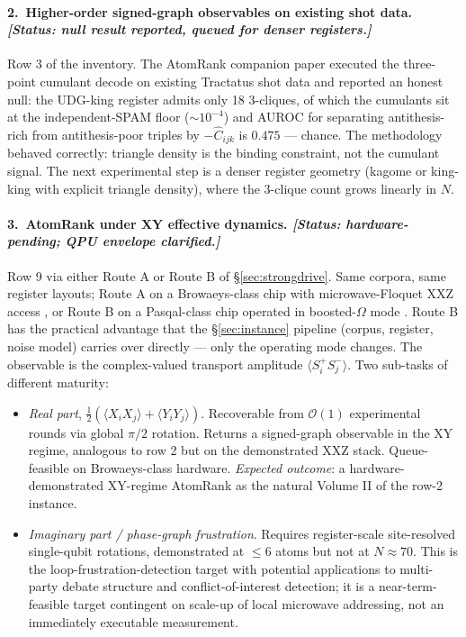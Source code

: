 \documentclass[10pt]{article}
\begin{document}
\paragraph{2.\ Higher-order signed-graph observables on existing shot data. \emph{[Status: null result reported, queued for denser registers.]}}
Row 3 of the inventory. The AtomRank companion paper \cite{jurczak2026atomrank} executed the three-point cumulant decode on existing Tractatus shot data and reported an honest null: the UDG-king register admits only 18 3-cliques, of which the cumulants sit at the independent-SPAM floor ($\sim 10^{-4}$) and AUROC for separating antithesis-rich from antithesis-poor triples by $-\hat C_{ijk}$ is $0.475$ --- chance. The methodology behaved correctly: triangle density is the binding constraint, not the cumulant signal. The next experimental step is a denser register geometry (kagome or king-king with explicit triangle density), where the 3-clique count grows linearly in $N$.

\paragraph{3.\ AtomRank under XY effective dynamics. \emph{[Status: hardware-pending; QPU envelope clarified.]}}
Row 9 via either Route A or Route B of \S\ref{sec:strongdrive}. Same corpora, same register layouts; Route A on a Browaeys-class chip with microwave-Floquet XXZ access \cite{scholl2022microwave,chen2024spectroscopy}, or Route B on a Pasqal-class chip operated in boosted-$\Omega$ mode \cite{ciavarella2022heisenberg}. Route B has the practical advantage that the \S\ref{sec:instance} pipeline (corpus, register, noise model) carries over directly --- only the operating mode changes. The observable is the complex-valued transport amplitude $\langle S^+_i S^-_j\rangle$. Two sub-tasks of different maturity:
\begin{itemize}[leftmargin=2em, itemsep=0.2em, topsep=0.3em]
\item[\textit{3a.}] \emph{Real part}, $\tfrac{1}{2}(\langle X_iX_j\rangle + \langle Y_iY_j\rangle)$. Recoverable from $\mathcal{O}(1)$ experimental rounds via global $\pi/2$ rotation. Returns a signed-graph observable in the XY regime, analogous to row 2 but on the demonstrated XXZ stack. Queue-feasible on Browaeys-class hardware. \emph{Expected outcome}: a hardware-demonstrated XY-regime AtomRank as the natural Volume II of the row-2 instance.
\item[\textit{3b.}] \emph{Imaginary part / phase-graph frustration}. Requires register-scale site-resolved single-qubit rotations, demonstrated at $\leq 6$ atoms \cite{bornet2024arbitrary} but not at $N \approx 70$. This is the loop-frustration-detection target with potential applications to multi-party debate structure and conflict-of-interest detection; it is a near-term-feasible target contingent on scale-up of local microwave addressing, not an immediately executable measurement.
\end{itemize}
\end{document}
